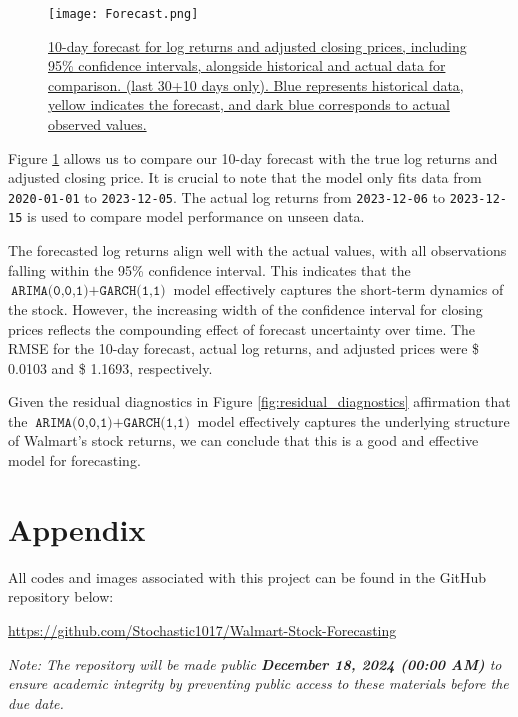 \documentclass{article}
\newcommand{\1}{\mathbbm{1}}
\theoremstyle{definition}
\begin{document}
\begin{figure}[H]
\centering
\texttt{[image: Forecast.png]}
\caption{\small{\href{https://github.com/Stochastic1017/Walmart-Stock-Forecasting/blob/main/R/Plot_Forecast.R}{10-day forecast for log returns and adjusted closing prices, including 95\% confidence intervals, alongside historical and actual data for comparison. (last 30+10 days only). Blue represents historical data, yellow indicates the forecast, and dark blue corresponds to actual observed values.}}}
\label{fig:forecast}
\end{figure}

Figure \ref{fig:forecast} allows us to compare our 10-day forecast with the true log returns and adjusted closing price. It is crucial to note that the model only fits data from \texttt{2020-01-01} to \texttt{2023-12-05}. The actual log returns from \texttt{2023-12-06} to \texttt{2023-12-15} is used to compare model performance on unseen data.

The forecasted log returns align well with the actual values, with all observations falling within the 95\% confidence interval. This indicates that the $\texttt{ARIMA(0,0,1)} + \texttt{GARCH(1,1)}$ model effectively captures the short-term dynamics of the stock. However, the increasing width of the confidence interval for closing prices reflects the compounding effect of forecast uncertainty over time. The RMSE for the 10-day forecast, actual log returns, and adjusted prices were \$ 0.0103 and \$ 1.1693, respectively.

Given the residual diagnostics in Figure \ref{fig:residual_diagnostics} affirmation that the $\texttt{ARIMA(0,0,1)} + \texttt{GARCH(1,1)}$ model effectively captures the underlying structure of Walmart's stock returns, we can conclude that this is a good and effective model for forecasting.



\newpage
\section*{Appendix}

All codes and images associated with this project can be found in the GitHub repository below:

\begin{center}
\url{https://github.com/Stochastic1017/Walmart-Stock-Forecasting}
\end{center}

\textit{Note: The repository will be made public \textbf{December 18, 2024 (00:00 AM)} to ensure academic integrity by preventing public access to these materials before the due date.}\\
\end{document}
